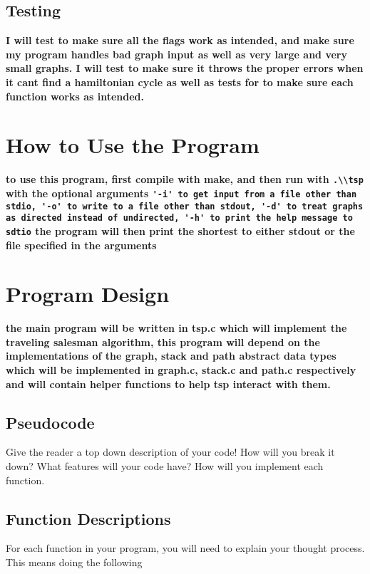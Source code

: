 \documentclass{article}
\begin{document}
\subsection*{Testing}

\textbf{I will test to make sure all the flags work as intended, and make sure my program handles bad graph input as well as very large and very small graphs. I will test to make sure it throws the proper errors when it cant find a hamiltonian cycle as well as tests for to make sure each function works as intended.}

\section*{How to Use the Program}

\textbf{to use this program, first compile with make, and then run with \lstinline{.\\tsp} with the optional arguments \lstinline{'-i' to get input from a file other than stdio, '-o' to write to a file other than stdout, '-d' to treat graphs as directed instead of undirected, '-h' to print the help message to sdtio} the program will then print the shortest to either stdout or the file specified in the arguments}

\section*{Program Design}

\textbf{the main program will be written in tsp.c which will implement the traveling salesman algorithm, this program will depend on the implementations of the graph, stack and path abstract data types which will be implemented in graph.c, stack.c and path.c respectively and will contain helper functions to help tsp interact with them.}

\subsection*{Pseudocode}
Give the reader a top down description of your code! How will you break it down? What features will your code have? 
How will you implement each function. 

\subsection*{Function Descriptions}
For each function in your program, you will need to explain your thought process. This means doing the following
\end{document}
